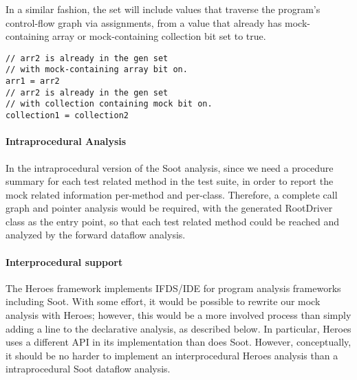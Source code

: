 In a similar fashion, the set will include values that traverse the program's control-flow graph via assignments, from a value that already has mock-containing array or mock-containing collection bit set to true.

\begin{lstlisting}[basicstyle=\ttfamily\small,numbers=none]
// arr2 is already in the gen set 
// with mock-containing array bit on.
arr1 = arr2
// arr2 is already in the gen set 
// with collection containing mock bit on.
collection1 = collection2
\end{lstlisting}





\paragraph{Intraprocedural Analysis} In the intraprocedural version of the Soot analysis, since we need a procedure summary for each test related method in the test suite, in order to report the mock related information per-method and per-class. Therefore, a complete call graph and pointer analysis would be required, with the generated RootDriver class as the entry point, so that each test related method could be reached and analyzed by the forward dataflow analysis.

\paragraph{Interprocedural support} The Heroes framework\cite{bodden12:_inter_proced_data_flow_analy} implements IFDS/IDE for program analysis frameworks including Soot. With some effort, it would be possible to rewrite our mock analysis with Heroes; however, this would be a more involved process than simply adding a line to the declarative analysis, as described below. In particular, Heroes uses a different API in its implementation than does Soot. However, conceptually, it should be no harder to implement an interprocedural Heroes analysis than a intraprocedural Soot dataflow analysis.

